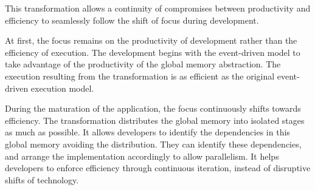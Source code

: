 This transformation allows a continuity of compromises between productivity and efficiency to seamlessly follow the shift of focus during development.






At first, the focus remains on the productivity of development rather than the efficiency of execution.
The development begins with the event-driven model to take advantage of the productivity of the global memory abstraction.
The execution resulting from the transformation is as efficient as the original event-driven execution model.


During the maturation of the application, the focus continuously shifts towards efficiency.
The transformation distributes the global memory into isolated stages as much as possible.
It allows developers to identify the dependencies in this global memory avoiding the distribution.
They can identify these dependencies, and arrange the implementation accordingly to allow parallelism.
It helps developers to enforce efficiency through continuous iteration, instead of disruptive shifts of technology.

